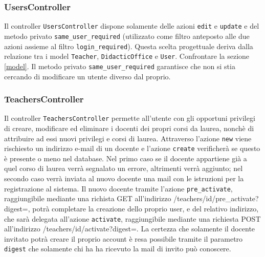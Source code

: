 \documentclass[11pt,a4paper]{article}
\begin{document}
\subsubsection{UsersController}
Il controller \verb|UsersController| dispone solamente delle azioni \verb|edit| e \verb|update| e del metodo privato \verb|same_user_required| (utilizzato come filtro anteposto alle due azioni assieme al filtro \verb|login_required|). Questa scelta progettuale deriva dalla relazione tra i model \verb|Teacher|, \verb|DidacticOffice| e \verb|User|. Confrontare la sezione \ref{model}.
Il metodo privato \verb|same_user_required| garantisce che non si stia cercando di modificare un utente diverso dal proprio.
\subsubsection{TeachersController}
Il controller \verb|TeachersController| permette all'utente con gli opportuni privilegi di creare, modificare ed eliminare i docenti dei propri corsi da laurea, nonchè di attribuire ad essi nuovi privilegi e corsi di laurea. Attraverso l'azione \verb|new| viene rischiesto un indirizzo e-mail di un docente e l'azione \verb|create| verificherà se questo è presente o meno nel database. Nel primo caso se il docente appartiene già a quel corso di laurea verrà segnalato un errore, altrimenti verrà aggiunto; nel secondo caso verrà inviata al nuovo docente una mail con le istruzioni per la registrazione al sistema. Il nuovo docente tramite l'azione \verb|pre_activate|, raggiungibile mediante una richista GET all'indirizzo /teachers/id/pre\_activate?digest=, potrà completare la creazione dello proprio user, e del relativo indirizzo, che sarà delegata all'azione \verb|activate|, raggiungibile mediante una richiesta POST all'indirizzo /teachers/id/activate?digest=. La certezza che solamente il docente invitato potrà creare il proprio account è resa possibile tramite il parametro \verb|digest| che solamente chi ha ha ricevuto la mail di invito può conoscere.
\end{document}
